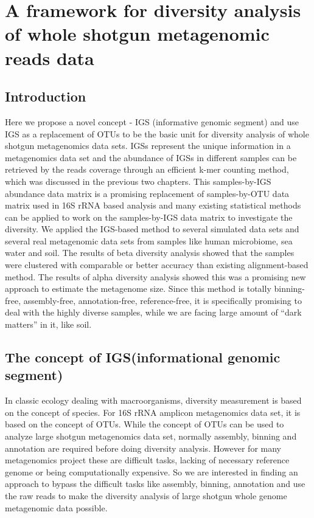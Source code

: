 \chapter{A framework for diversity analysis of whole shotgun metagenomic reads data}



\section{Introduction}



Here we propose a novel concept - IGS (informative genomic 
segment) and use IGS as a replacement of OTUs to be the basic unit for 
diversity analysis of whole shotgun metagenomics data sets. IGSs represent the 
unique information in a metagenomics data set and the abundance of IGSs in 
different samples can be retrieved by the reads coverage through an efficient 
k-mer counting method, which was discussed in the previous two chapters.
This samples-by-IGS abundance data matrix is a promising
replacement of samples-by-OTU data matrix used in 16S rRNA based analysis and 
many existing statistical methods can be applied to work on the samples-by-IGS 
data matrix to investigate the diversity. We applied the IGS-based method to 
several simulated data sets and several real metagenomic data sets from samples
like human microbiome, sea water and soil. The results of beta diversity analysis
showed that the samples were clustered with comparable or better accuracy than 
existing alignment-based method. The results of alpha diversity analysis 
showed this was a promising new approach to estimate the metagenome size.
Since this method is totally binning-free, 
assembly-free, annotation-free, reference-free, it is specifically promising 
to deal with the highly diverse samples, while we are facing large amount of 
``dark matters'' in it, like soil.



\section{The concept of IGS(informational genomic segment)}

In classic ecology dealing with macroorganisms, diversity measurement is based 
on the concept of species. For 16S rRNA amplicon metagenomics data set, it is 
based on the concept of OTUs. While the concept of OTUs can be used to analyze
large shotgun metagenomics data set, normally assembly, binning and annotation
are required before doing diversity analysis. However for many metagenomics 
project these are difficult
tasks, lacking of necessary reference genome or being computationally
expensive. So we are interested in finding an approach to bypass the difficult
tasks like assembly, binning, annotation and use the raw reads to make the 
diversity analysis of large shotgun whole genome metagenomic data possible. 

